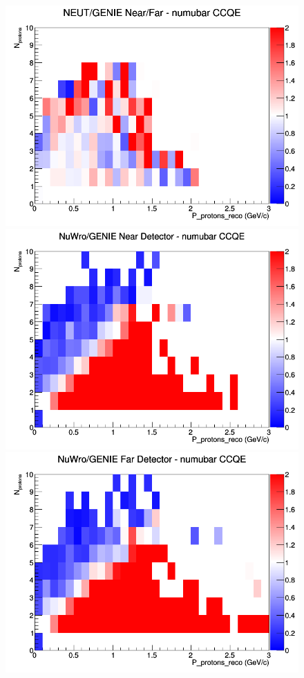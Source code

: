 \documentclass[12pt]{article}
\begin{document}
\begin{figure}[h]
\endminipage
{}
\includegraphics[width=\linewidth]{eff_N_P/LAr/protons/ratios/CCQE_NEUT_GENIE_numubar_NF_N_P.png}
\endminipage
\newline
{}
\includegraphics[width=\linewidth]{eff_N_P/LAr/protons/ratios/CCQE_NuWro_GENIE_numubar_near_N_P.png}
\endminipage
{}
\includegraphics[width=\linewidth]{eff_N_P/LAr/protons/ratios/CCQE_NuWro_GENIE_numubar_far_N_P.png}

\end{figure}
\end{document}

